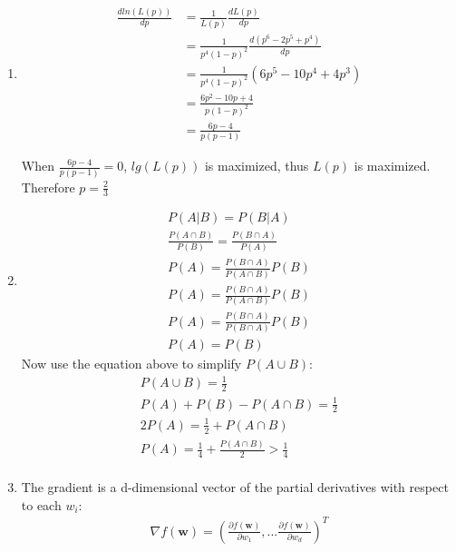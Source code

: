 \documentclass[12pt]{article}
\begin{document}
\begin{enumerate}[label=(\alph*)]
\item
\begin{equation}
\begin{split}
    \frac{dln(L(p))}{dp} &= \frac{1}{L(p)}\frac{dL(p)}{dp} \\
    &= \frac{1}{p^4(1-p)^2}\frac{d(p^6 - 2p^5 + p^4)}{dp} \\
    &= \frac{1}{p^4(1-p)^2}(6p^5 - 10p^4 + 4p^3) \\
    &= \frac{6p^2 - 10p + 4}{p(1-p)^2} \\
    &= \frac{6p - 4}{p(p-1)}
\end{split}
\end{equation}

When \(\frac{6p - 4}{p(p-1)}  = 0\), \(lg(L(p))\) is maximized, thus \(L(p)\) is maximized. Therefore \(p = \frac{2}{3}\)

\item
\begin{equation}
\begin{matrix}
    P(A|B) = P(B|A) \\
    \frac{P(A \cap B)}{P(B)} = \frac{P(B \cap A)}{P(A)} \\
    P(A) = \frac{P(B \cap A)}{P(A \cap B)}P(B) \\
    P(A) = \frac{P(B \cap A)}{P(A \cap B)}P(B) \\
    P(A) = \frac{P(B \cap A)}{P(B \cap A)}P(B) \\
    P(A) = P(B)
\end{matrix}
\end{equation}
Now use the equation above to simplify \(P(A \cup B)\):
\begin{equation}
\begin{matrix}
    P(A \cup B) = \frac{1}{2} \\
    P(A) + P(B) - P(A \cap B) = \frac{1}{2} \\
    2 P(A) = \frac{1}{2} + P(A \cap B) \\
     P(A) = \frac{1}{4} + \frac{P(A \cap B)}{2} > \frac{1}{4} \\
\end{matrix}
\end{equation}

\item
The gradient is a d-dimensional vector of the partial derivatives with respect to each \(w_i\):
\begin{equation}
\begin{matrix}
    \nabla f(\boldsymbol{w}) = (\frac{\partial{f(\boldsymbol{w})}}{\partial{w_1}}, ... \frac{\partial{f(\boldsymbol{w})}}{\partial{w_d}})^T
\end{matrix}
\end{equation}


\end{enumerate}
\end{document}
